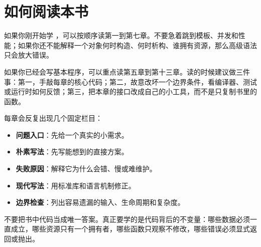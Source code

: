 \chapter*{如何阅读本书}

如果你刚开始学 \cpp，可以按顺序读第一到第七章。不要急着跳到模板、并发和性能；如果你还不能解释一个对象何时构造、何时析构、谁拥有资源，那么高级语法只会放大错误。

如果你已经会写基本程序，可以重点读第五章到第十三章。读的时候建议做三件事：第一，手敲每章的核心代码；第二，故意改坏一个边界条件，看编译器、测试或运行时如何反馈；第三，把本章的接口改成自己的小工具，而不是只复制书里的函数。

每章会反复出现几个固定栏目：

\begin{itemize}
  \item \textbf{问题入口}：先给一个真实的小需求。
  \item \textbf{朴素写法}：先写能想到的直接方案。
  \item \textbf{失败原因}：解释它为什么会错、慢或难维护。
  \item \textbf{现代写法}：用标准库和语言机制修正。
  \item \textbf{边界检查}：列出容易遗漏的输入、生命周期和复杂度。
\end{itemize}

\begin{warningbox}
不要把书中代码当成唯一答案。真正要学的是代码背后的不变量：哪些数据必须一直成立，哪些资源只有一个拥有者，哪些函数只观察不修改，哪些错误必须显式返回或抛出。
\end{warningbox}
